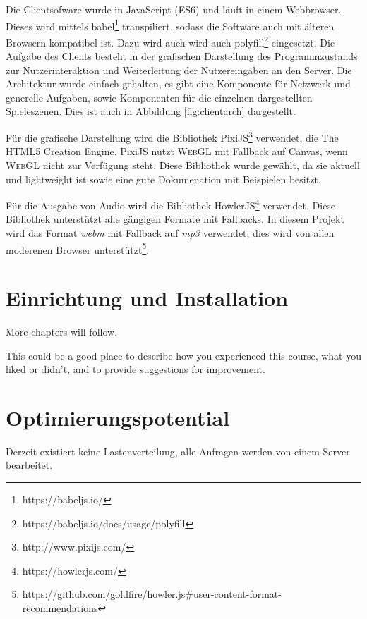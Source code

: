 \documentclass[ngerman,11pt]{report}
\begin{document}
Die Clientsofware wurde in JavaScript (ES6) und läuft in einem Webbrowser. Dieses wird
mittels babel\footnote{https://babeljs.io/} transpiliert, sodass die Software auch mit
älteren Browsern kompatibel ist. Dazu wird auch wird auch
polyfill\footnote{https://babeljs.io/docs/usage/polyfill} eingesetzt. Die Aufgabe des Clients
besteht in der grafischen Darstellung des Programmzustands zur Nutzerinteraktion und
Weiterleitung der Nutzereingaben an den Server. Die Architektur wurde einfach gehalten,
es gibt eine Komponente für Netzwerk und generelle Aufgaben, sowie Komponenten für die
einzelnen dargestellten Spieleszenen. Dies ist auch in Abbildung \ref{fig:clientarch} dargestellt.

Für die grafische Darstellung wird die Bibliothek PixiJS\footnote{http://www.pixijs.com/}
verwendet, die \glqq The HTML5 Creation Engine\grqq. PixiJS nutzt \textsc{WebGL} mit
Fallback auf Canvas, wenn \textsc{WebGL} nicht zur Verfügung steht. Diese Bibliothek
wurde gewählt, da sie aktuell und lightweight ist sowie  eine gute Dokumenation mit
Beispielen besitzt.

Für die Ausgabe von Audio wird die Bibliothek HowlerJS\footnote{https://howlerjs.com/}
verwendet. Diese Bibliothek unterstützt alle gängigen Formate mit Fallbacks. In
diesem Projekt wird das Format \textit{webm} mit Fallback auf \textit{mp3} verwendet, dies
wird von allen moderenen Browser
unterstützt\footnote{https://github.com/goldfire/howler.js#user-content-format-recommendations}.



\chapter{Einrichtung und Installation}

More chapters will follow.


This could be a good place to describe how you experienced this course, what you liked or didn't, and to provide suggestions for improvement.

\chapter{Optimierungspotential}

Derzeit existiert keine Lastenverteilung, alle Anfragen werden von einem Server bearbeitet.
\end{document}
